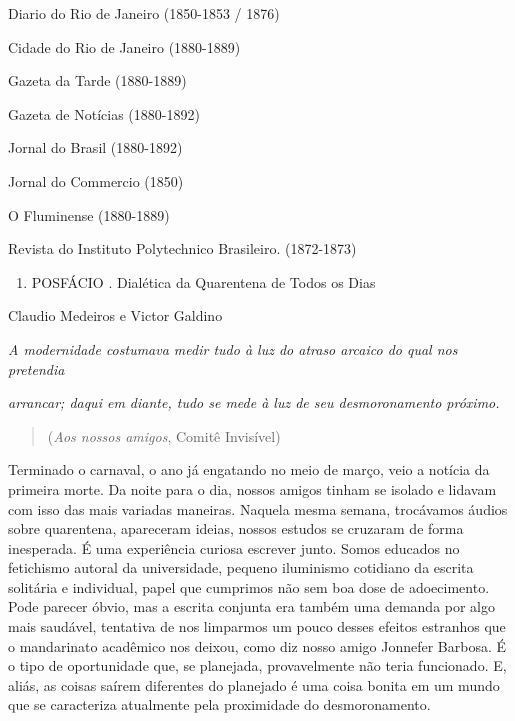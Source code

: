 Diario do Rio de Janeiro (1850-1853 / 1876)

Cidade do Rio de Janeiro (1880-1889)

Gazeta da Tarde (1880-1889)

Gazeta de Notícias (1880-1892)

Jornal do Brasil (1880-1892)

Jornal do Commercio (1850)

O Fluminense (1880-1889)

Revista do Instituto Polytechnico Brasileiro. (1872-1873)

\begin{enumerate}
\def\labelenumi{\arabic{enumi}.}
\setcounter{enumi}{6}
\tightlist
\item
  POSFÁCIO . Dialética da Quarentena de Todos os Dias
\end{enumerate}

Claudio Medeiros e Victor Galdino

\emph{A modernidade costumava medir tudo à luz do atraso arcaico do qual
nos pretendia~}

\emph{arrancar; daqui em diante, tudo se mede à luz de seu
desmoronamento próximo.}

\begin{quote}
(\emph{Aos nossos amigos}, Comitê Invisível)
\end{quote}

Terminado o carnaval, o ano já engatando no meio de março, veio a
notícia da primeira morte. Da noite para o dia, nossos amigos tinham se
isolado e lidavam com isso das mais variadas maneiras. Naquela mesma
semana, trocávamos áudios sobre quarentena, apareceram ideias, nossos
estudos se cruzaram de forma inesperada. É uma experiência curiosa
escrever junto. Somos educados no fetichismo autoral da universidade,
pequeno iluminismo cotidiano da escrita solitária e individual, papel
que cumprimos não sem boa dose de adoecimento. Pode parecer óbvio, mas a
escrita conjunta era também uma demanda por algo mais saudável,
tentativa de nos limparmos um pouco desses efeitos estranhos que o
mandarinato acadêmico nos deixou, como diz nosso amigo Jonnefer Barbosa.
É o tipo de oportunidade que, se planejada, provavelmente não teria
funcionado. E, aliás, as coisas saírem diferentes do planejado é uma
coisa bonita em um mundo que se caracteriza atualmente pela proximidade
do desmoronamento.~

